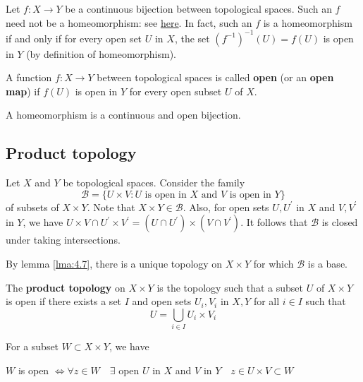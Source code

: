 \documentclass[a4paper]{article}
\begin{document}
\begin{note}
    Let $f: X \rightarrow Y$ be a continuous bijection between topological spaces. Such an $f$ need not be a homeomorphism: see \href{https://math.stackexchange.com/questions/378717/finding-counterexamples-bijective-continuous-functions-that-are-not-homeomorphi}{here}. In fact, such an $f$ is a homeomorphism if and only if for every open set $U$ in $X$, the set $\left(f^{-1}\right)^{-1}(U)=f(U)$ is open in $Y$ (by definition of homeomorphism).
\end{note}

\begin{definition}
    A function $f: X \rightarrow Y$ between topological spaces is called \textbf{open} (or an \textbf{open map}) if $f(U)$ is open in $Y$ for every open subset $U$ of $X$.
\end{definition}

\begin{remark}
    A homeomorphism is a continuous and open bijection.
\end{remark}

\subsection{Product topology}
Let $X$ and $Y$ be topological spaces. Consider the family
$$
\mathcal{B}=\{U \times V: U \text { is open in } X \text { and } V \text { is open in } Y\}
$$
of subsets of $X \times Y$. Note that $X \times Y \in \mathcal{B}$. Also, for open sets $U, U^{\prime}$ in $X$ and $V, V^{\prime}$ in $Y$, we have $U \times V \cap U^{\prime} \times V^{\prime}=\left(U \cap U^{\prime}\right) \times\left(V \cap V^{\prime}\right)$. It follows that $\mathcal{B}$ is closed under taking intersections.

By lemma \ref{lma:4.7}, there is a unique topology on $X \times Y$ for which $\mathcal{B}$ is a base. 

\begin{definition}
    The \textbf{product topology} on \( X \times Y \) is the topology such that a subset \( U \) of \( X \times Y \) is open if there exists a set \( I \) and open sets \( U_i, V_i \) in \( X, Y \) for all \( i \in I \) such that
	\[
		U = \bigcup_{i \in I} U_i \times V_i
	\]
\end{definition}

\begin{note}
    For a subset $W \subset X \times Y$, we have

\begin{center}
    $W$ is open $\Longleftrightarrow \forall z \in W \quad \exists$ open $U$ in $X$ and $V$ in $Y \quad z \in U \times V \subset W$
\end{center}
\end{note}
\end{document}
